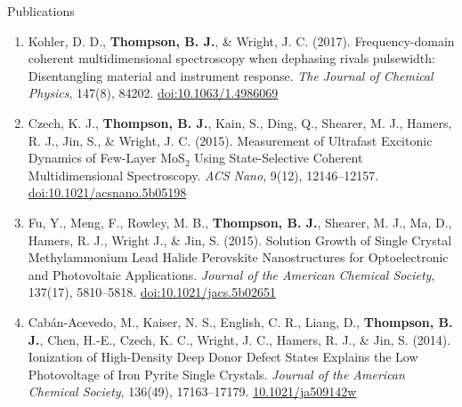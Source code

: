 \documentclass{resume}  %
\begin{document}
\begin{rSection}{Publications}
  \begin{enumerate}[leftmargin = 0 pt]
    \item Kohler, D. D., \textbf{Thompson, B. J.}, \& Wright, J. C. (2017). Frequency-domain
      coherent multidimensional spectroscopy when dephasing rivals pulsewidth:
      Disentangling material and instrument response.
      \textit{The Journal of Chemical Physics}, 147(8), 84202.
      \href{https://doi.org/10.1063/1.4986069}{doi:10.1063/1.4986069}
    \item Czech, K. J., \textbf{Thompson, B. J.}, Kain, S., Ding, Q., Shearer, M. J., Hamers,
      R. J., Jin, S., \& Wright, J. C. (2015). Measurement of Ultrafast Excitonic Dynamics of
      Few-Layer MoS$_2$ Using State-Selective Coherent Multidimensional Spectroscopy.
      \textit{ACS Nano}, 9(12), 12146–12157.
      \href{https://doi.org/10.1021/acsnano.5b05198}{doi:10.1021/acsnano.5b05198}
    \item Fu, Y., Meng, F., Rowley, M. B., \textbf{Thompson, B. J.}, Shearer, M. J.,
      Ma, D., Hamers, R. J., Wright J., \& Jin, S. (2015). Solution Growth of Single Crystal
      Methylammonium Lead Halide Perovskite Nanostructures for Optoelectronic and
      Photovoltaic Applications.
      \textit{Journal of the American Chemical Society}, 137(17), 5810–5818.
      \href{https://doi.org/10.1021/jacs.5b02651}{doi:10.1021/jacs.5b02651}
    \item Cabán-Acevedo, M., Kaiser, N. S., English, C. R., Liang, D., \textbf{Thompson, B. J.},
      Chen, H.-E., Czech, K. C., Wright, J. C., Hamers, R. J., \& Jin, S. (2014).
      Ionization of High-Density Deep Donor Defect States Explains the Low
      Photovoltage of Iron Pyrite Single Crystals.
      \textit{Journal of the American Chemical Society}, 136(49), 17163–17179.
      \href{https://doi.org/10.1021/ja509142w}{10.1021/ja509142w}
  \end{enumerate}
\end{rSection}
\end{document}
